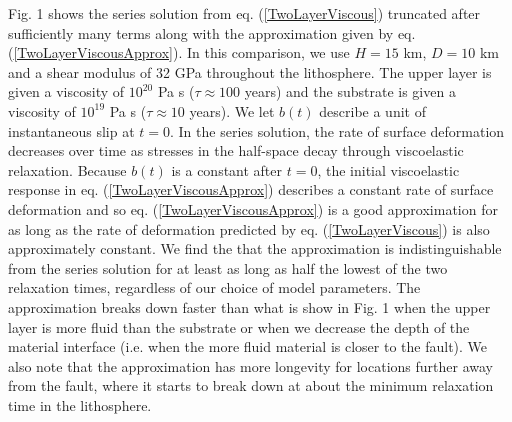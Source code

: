 Fig. 1 shows the series solution from eq. (\ref{TwoLayerViscous})
truncated after sufficiently many terms along with the approximation
given by eq. (\ref{TwoLayerViscousApprox}). In this comparison, we use
$H=15$ km, $D=10$ km and a shear modulus of 32 GPa throughout the
lithosphere.  The upper layer is given a viscosity of $10^{20}$ Pa s
($\tau\approx 100$ years) and the substrate is given a viscosity of
$10^{19}$ Pa s ($\tau\approx 10$ years).  We let $b(t)$ describe a
unit of instantaneous slip at $t=0$.  In the series solution, the
rate of surface deformation decreases over time as stresses in the
half-space decay through viscoelastic relaxation.  Because $b(t)$ is a
constant after $t=0$, the initial viscoelastic response in
eq. (\ref{TwoLayerViscousApprox}) describes a constant rate of surface
deformation and so eq. (\ref{TwoLayerViscousApprox}) is a good
approximation for as long as the rate of deformation predicted by
eq. (\ref{TwoLayerViscous}) is also approximately constant. We find
the that the approximation is indistinguishable from the series
solution for at least as long as half the lowest of the two relaxation
times, regardless of our choice of model parameters.  The
approximation breaks down faster than what is show in Fig. 1 when
the upper layer is more fluid than the substrate or when we decrease the
depth of the material interface (i.e. when the more fluid material is
closer to the fault).  We also note that the approximation has more
longevity for locations further away from the fault, where it starts
to break down at about the minimum relaxation time in the lithosphere.

